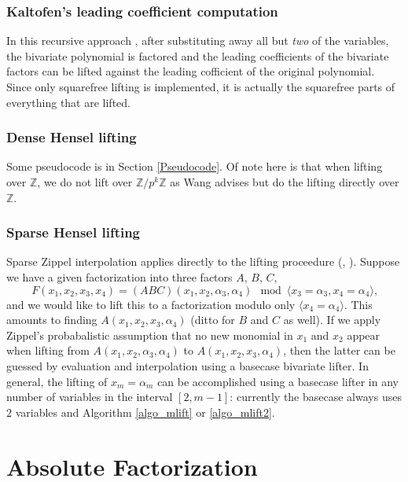 \documentclass[11pt,reqno]{amsart}
\numberwithin{equation}{section}
\begin{document}
\subsubsection{Kaltofen's leading coefficient computation}
In this recursive approach \cite{KALTOFEN}, after substituting away all but
\emph{two} of the variables, the bivariate polynomial is factored and the
leading coefficients of the bivariate factors can be lifted against the leading
cofficient of the original polynomial. Since only squarefree lifting is
implemented, it is actually the squarefree parts of everything that are lifted.

\subsubsection{Dense Hensel lifting}
Some pseudocode is in Section \ref{Pseudocode}. Of note here is that when
lifting over $\mathbb{Z}$, we do not lift over $\mathbb{Z}/p^k\mathbb{Z}$ as
Wang \cite{WANG} advises but do the lifting directly over $\mathbb{Z}$.

\subsubsection{Sparse Hensel lifting}
Sparse Zippel interpolation applies directly to the lifting proceedure
(\cite{SHLZIP}, \cite{SHL}). Suppose we have a given factorization into three
factors $A$, $B$, $C$,
\begin{equation*}
F(x_1, x_2, x_3, x_4) = (A B C)(x_1, x_2, \alpha_3, \alpha_4) \mod \langle x_3
=\alpha_3, x_4=\alpha_4 \rangle\text{,}
\end{equation*}
and we would like to lift this to a factorization modulo only $\langle
x_4=\alpha_4 \rangle$. This amounts to finding $A(x_1, x_2, x_3, \alpha_4)$
(ditto for $B$ and $C$ as well). If we apply Zippel's probabalistic assumption
that no new monomial in $x_1$ and $x_2$ appear when lifting from $A(x_1, x_2,
\alpha_3, \alpha_4)$ to $A(x_1, x_2, x_3, \alpha_4)$, then the latter can be
guessed by evaluation and interpolation using a basecase bivariate lifter. In
general, the lifting of $x_m = \alpha_m$ can be accomplished using a basecase
lifter in any number of variables in the interval $[2,m-1]$: currently the
basecase always uses $2$ variables and Algorithm \ref{algo_mlift} or
\ref{algo_mlift2}.

\section{Absolute Factorization}
\end{document}

